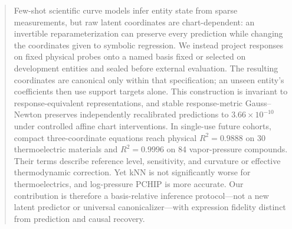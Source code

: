 \begin{abstract}
Few-shot scientific curve models infer entity state from sparse measurements,
but raw latent coordinates are chart-dependent: an invertible
reparameterization can preserve every prediction while changing the coordinates
given to symbolic regression.  We instead project responses on fixed physical
probes onto a named basis fixed or selected on development entities and sealed
before external evaluation.  The resulting coordinates are canonical only
within that specification; an unseen entity's coefficients then use support
targets alone.  This construction is invariant to response-equivalent
representations, and stable response-metric Gauss--Newton preserves independently
recalibrated predictions to $3.66\times10^{-10}$ under controlled affine chart
interventions.  In single-use future cohorts, compact three-coordinate equations
reach physical $R^2=0.9888$ on 30 thermoelectric materials and $R^2=0.9996$ on
84 vapor-pressure compounds.  Their terms describe reference level, sensitivity,
and curvature or effective thermodynamic correction.  Yet kNN is not
significantly worse for thermoelectrics, and log-pressure PCHIP is more accurate.
Our contribution is therefore a basis-relative inference protocol---not a new
latent predictor or universal canonicalizer---with expression fidelity distinct
from prediction and causal recovery.
\end{abstract}
